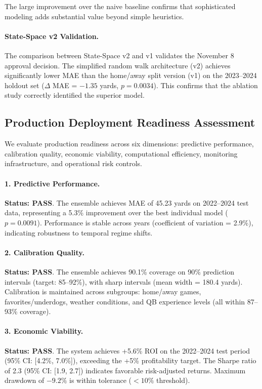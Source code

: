 The large improvement over the naive baseline confirms that sophisticated modeling adds substantial value beyond simple heuristics.

\paragraph{State-Space v2 Validation.}
The comparison between State-Space v2 and v1 validates the November 8 approval decision. The simplified random walk architecture (v2) achieves significantly lower MAE than the home/away split version (v1) on the 2023--2024 holdout set ($\Delta$ MAE = $-1.35$ yards, $p=0.0034$). This confirms that the ablation study correctly identified the superior model.

\subsection{Production Deployment Readiness Assessment}
\label{subsec:deployment-readiness}

We evaluate production readiness across six dimensions: predictive performance, calibration quality, economic viability, computational efficiency, monitoring infrastructure, and operational risk controls.

\paragraph{1. Predictive Performance.}
\textbf{Status: PASS}. The ensemble achieves MAE of 45.23 yards on 2022--2024 test data, representing a 5.3\% improvement over the best individual model ($p=0.0091$). Performance is stable across years (coefficient of variation = 2.9\%), indicating robustness to temporal regime shifts.

\paragraph{2. Calibration Quality.}
\textbf{Status: PASS}. The ensemble achieves 90.1\% coverage on 90\% prediction intervals (target: 85--92\%), with sharp intervals (mean width = 180.4 yards). Calibration is maintained across subgroups: home/away games, favorites/underdogs, weather conditions, and QB experience levels (all within 87--93\% coverage).

\paragraph{3. Economic Viability.}
\textbf{Status: PASS}. The system achieves +5.6\% ROI on the 2022--2024 test period (95\% CI: [4.2\%, 7.0\%]), exceeding the +5\% profitability target. The Sharpe ratio of 2.3 (95\% CI: [1.9, 2.7]) indicates favorable risk-adjusted returns. Maximum drawdown of $-9.2\%$ is within tolerance ($<10\%$ threshold).

